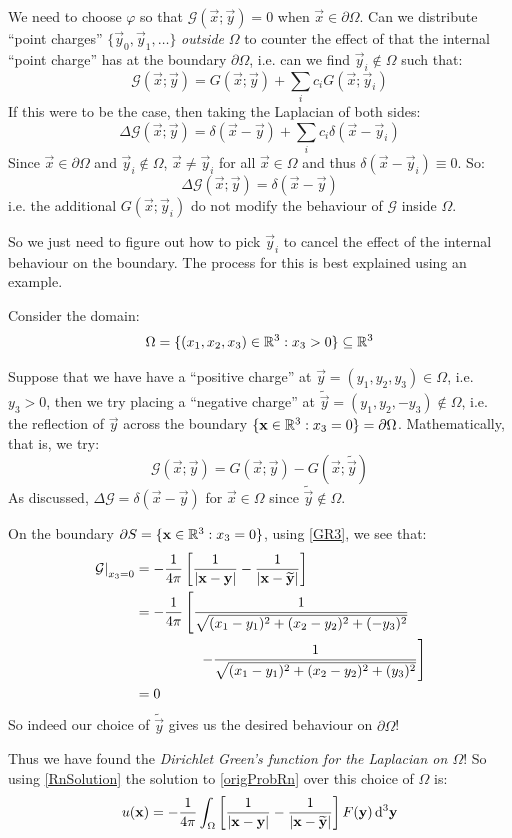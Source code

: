\documentclass[../main.tex]{subfiles}
\begin{document}
We need to choose $\varphi$ so that $\mathcal{G}(\vec{x}; \vec{y}) = 0$ when $\vec{x} \in \partial \Omega$.
Can we distribute ``point charges'' $\{\vec{y}_0, \vec{y}_1, \ldots\}$ \textit{outside} $\Omega$ to counter the effect of that the internal ``point charge'' has at the boundary $\partial \Omega$, i.e. can we find $\vec{y}_i \notin \Omega$ such that:
\[
  \mathcal{G}(\vec{x}; \vec{y}) = G(\vec{x}; \vec{y}) + \sum_{i} c_i G(\vec{x}; \vec{y}_i)
\]
If this were to be the case, then taking the Laplacian of both sides:
\[
  \Delta \mathcal{G}(\vec{x}; \vec{y}) = \delta(\vec{x} - \vec{y}) + \sum_{i} c_i \delta(\vec{x} - \vec{y}_i)
\]
Since $\vec{x} \in \partial \Omega$ and $\vec{y}_i \notin \Omega$, $\vec{x} \neq \vec{y}_i$ for all $\vec{x} \in \Omega$ and thus $\delta(\vec{x} - \vec{y}_i) \equiv 0$.
So:
\[
  \Delta \mathcal{G}(\vec{x}; \vec{y}) = \delta(\vec{x} - \vec{y})
\]
i.e. the additional $G(\vec{x}; \vec{y}_i)$ do not modify the behaviour of $\mathcal{G}$ inside $\Omega$.

So we just need to figure out how to pick $\vec{y}_i$ to cancel the effect of the internal behaviour on the boundary.
The process for this is best explained using an example.
\begin{example}
  Consider the domain:
  \[
    \Omega = \{(x_1, x_2, x_3) \in \mathbb{R}^3: x_3 > 0\} \subseteq \mathbb{R}^3
  \]

  Suppose that we have have a ``positive charge'' at $\vec{y} = (y_1, y_2, y_3) \in \Omega$, i.e. $y_3 > 0$, then we try placing a ``negative charge'' at $\widetilde{\vec{y}} = (y_1, y_2, -y_3) \notin \Omega$, i.e. the reflection of $\vec{y}$ across the boundary $\{\mathbf{\bm{x}} \in \mathbb{R}^3: x_3 = 0\} = \partial \Omega$.
  Mathematically, that is, we try:
  \[
    \mathcal{G}(\vec{x};  \vec{y}) = G(\vec{x}; \vec{y}) - G(\vec{x}; \widetilde{\vec{y}})
  \]
  As discussed, $\Delta \mathcal{G} = \delta(\vec{x} - \vec{y})$ for $\vec{x} \in \Omega$ since $\widetilde{\vec{y}} \notin \Omega$.

  On the boundary $\partial S = \{\mathbf{\bm{x}} \in \mathbb{R}^3: x_3 = 0\}$, using \cref{GR3}, we see that:
  \begin{align*}
    \left. \mathcal{G} \right|_{x_3 = 0} &= -\frac{1}{4\pi} \left[\frac{1}{|\mathbf{\bm{x}} - \mathbf{\bm{y}}|} - \frac{1}{|\mathbf{\bm{x}} - \widetilde{\mathbf{\bm{y}}}|}\right] \\
                              &= -\frac{1}{4\pi} \left[\frac{1}{\sqrt{(x_1 - y_1)^2 + (x_2 - y_2)^2 + (-y_3)^2}} \right. \\
                              &\hspace{1.6cm} \left.- \frac{1}{\sqrt{(x_1 - y_1)^2 + (x_2 - y_2)^2 + (y_3)^2}}\right] \\
                              &= 0
  \end{align*}
  So indeed our choice of $\widetilde{\vec{y}}$ gives us the desired behaviour on $\partial \Omega$!

  Thus we have found the \textit{Dirichlet Green's function for the Laplacian on $\Omega$}!
  So using \cref{RnSolution} the solution to \cref{origProbRn} over this choice of $\Omega$ is:
  \[
    u(\vec{x}) = -\frac{1}{4\pi} \int_{\Omega} \left[\frac{1}{|\vec{x} - \vec{y}|} - \frac{1}{|\vec{x} - \widetilde{\vec{y}}|}\right] F(\vec{y}) \d^3{\vec{y}}
  \]
\end{example}
\end{document}
